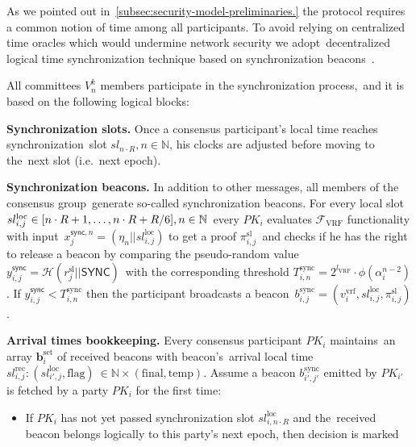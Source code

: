 As we pointed out in~\ref{subsec:security-model-preliminaries.} the protocol requires a common notion of time among all participants.
To avoid relying on centralized time oracles which would undermine network security we adopt\
decentralized logical time synchronization technique based on synchronization beacons~\cite{cryptoeprint:2019/838}.

All committees $V_{n}^k$ members participate in the synchronization process,\
and it is based on the following logical blocks:
\begin{legal}
    \item[]\textbf{Synchronization slots.} Once a consensus participant’s local time reaches synchronization\
    slot ${sl_{n \cdot R}, n \in \mathbb{N}}$, his clocks are adjusted before moving to the\
    next slot (i.e.\ next epoch).
    \item[]\textbf{Synchronization beacons.} In addition to other messages, all members of the consensus group\
    generate so-called synchronization beacons.
    For every local slot $sl_{i, j}^{\text{loc}} \in [n \cdot R + 1,\dots,n \cdot R + R \// 6], n \in \mathbb{N}$\
    every $PK_i$ evaluates $\mathcal{F}_{\text{VRF}}$ functionality with input\
    ${x_{j}^{\textsf{sync}, n} = (\eta_n || sl_{i, j}^{\text{loc}})}$ to get a proof $\pi_{i, j}^{\text{sl}}$\
    and checks if he has the right to release a beacon by comparing the pseudo-random value\
    ${y_{i, j}^{\textsf{sync}} = \mathcal{H}(r_{j}^{\text{sl}} || \textsf{SYNC})}$\
    with the corresponding threshold $T_{i, n}^{\text{sync}} = 2^{l_{\text{VRF}}} \cdot \phi(\alpha_{i}^{n - 2})$.
    If ${y_{i, j}^{\textsf{sync}} < T_{i, n}^{\text{sync}}}$ then the participant broadcasts a beacon\
    $b_{i, j}^{\text{sync}} = (v^{\text{vrf}}_i, sl_{i, j}^{\text{loc}}, \pi_{i, j}^{\text{sl}})$.
    \item[]\textbf{Arrival times bookkeeping.} Every consensus participant $PK_i$ maintains\
    an array $\mathbf{b}_i^{\text{set}}$ of received beacons with beacon's\
    arrival local time ${sl^{\text{rec}}_{i, j}: (sl_{i', j}^{\text{loc}}, \text{flag})\
    \in \mathbb{N} \times (\text{final}, \text{temp})}$.
    Assume a beacon $b_{i', j'}^{\text{sync}}$ emitted by $PK_{i'}$ is fetched by a party $PK_i$ for the first time:
    \begin{itemize}
        \item If $PK_i$ has not yet passed synchronization slot $sl_{i, n \cdot R}^{\text{loc}}$ and the\
        received beacon belongs logically to this party’s next epoch, then decision is marked\

\end{itemize}
\end{legal}

